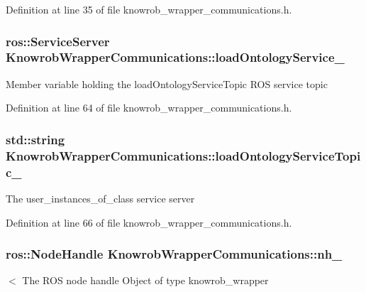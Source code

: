 Definition at line 35 of file knowrob\-\_\-wrapper\-\_\-communications.\-h.

\hypertarget{classKnowrobWrapperCommunications_aa0e819f7420b8e9f5315b9cfaac53bf4}{
\subsubsection[{load\-Ontology\-Service\-\_\-}]{\setlength{\rightskip}{0pt plus 5cm}ros\-::\-Service\-Server Knowrob\-Wrapper\-Communications\-::load\-Ontology\-Service\-\_\-\hspace{0.3cm}{\ttfamily [private]}}}\label{classKnowrobWrapperCommunications_aa0e819f7420b8e9f5315b9cfaac53bf4}
Member variable holding the load\-Ontology\-Service\-Topic R\-O\-S service topic 

Definition at line 64 of file knowrob\-\_\-wrapper\-\_\-communications.\-h.

\hypertarget{classKnowrobWrapperCommunications_a6d5a84e3b69d020b5e11595a2ae871b5}{
\subsubsection[{load\-Ontology\-Service\-Topic\-\_\-}]{\setlength{\rightskip}{0pt plus 5cm}std\-::string Knowrob\-Wrapper\-Communications\-::load\-Ontology\-Service\-Topic\-\_\-\hspace{0.3cm}{\ttfamily [private]}}}\label{classKnowrobWrapperCommunications_a6d5a84e3b69d020b5e11595a2ae871b5}
The user\-\_\-instances\-\_\-of\-\_\-class service server 

Definition at line 66 of file knowrob\-\_\-wrapper\-\_\-communications.\-h.

\hypertarget{classKnowrobWrapperCommunications_afe35871d80ea79c6446d2bdf39ba6204}{
\subsubsection[{nh\-\_\-}]{\setlength{\rightskip}{0pt plus 5cm}ros\-::\-Node\-Handle Knowrob\-Wrapper\-Communications\-::nh\-\_\-\hspace{0.3cm}{\ttfamily [private]}}}\label{classKnowrobWrapperCommunications_afe35871d80ea79c6446d2bdf39ba6204}
$<$ The R\-O\-S node handle Object of type knowrob\-\_\-wrapper 

